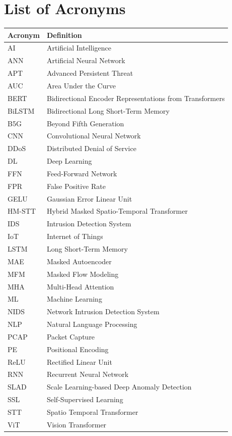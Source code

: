 \documentclass[12pt, a4paper]{report}
\begin{document}
\tableofcontents
\listoftables
\listoffigures

\part*{List of Acronyms}

\begin{longtable}{@{}p{2.5cm}p{12cm}@{}}
\toprule
\textbf{Acronym} & \textbf{Definition} \\
\midrule
\endhead

AI & Artificial Intelligence \\
ANN & Artificial Neural Network \\
APT &  Advanced Persistent Threat \\
AUC & Area Under the Curve \\
BERT & Bidirectional Encoder Representations from Transformers \\
BiLSTM & Bidirectional Long Short-Term Memory \\
B5G & Beyond Fifth Generation\\
CNN & Convolutional Neural Network \\
DDoS & Distributed Denial of Service \\
DL & Deep Learning \\
FFN & Feed-Forward Network \\
FPR & False Positive Rate \\
GELU & Gaussian Error Linear Unit \\
HM-STT & Hybrid Masked Spatio-Temporal Transformer \\
IDS & Intrusion Detection System \\
IoT & Internet of Things \\
LSTM & Long Short-Term Memory \\
MAE & Masked Autoencoder \\
MFM & Masked Flow Modeling \\
MHA & Multi-Head Attention \\
ML & Machine Learning \\
NIDS & Network Intrusion Detection System \\
NLP & Natural Language Processing \\
PCAP & Packet Capture \\
PE & Positional Encoding \\
ReLU & Rectified Linear Unit \\
RNN & Recurrent Neural Network \\
SLAD & Scale Learning-based Deep Anomaly Detection \\
SSL & Self-Supervised Learning \\
STT  & Spatio Temporal Transformer \\
ViT & Vision Transformer \\

\bottomrule
\end{longtable}
\end{document}
